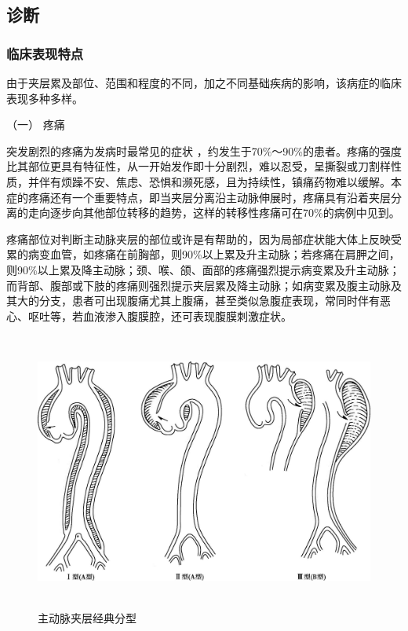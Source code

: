 \subsection{诊断}

\subsubsection{临床表现特点}

由于夹层累及部位、范围和程度的不同，加之不同基础疾病的影响，该病症的临床表现多种多样。

\hypertarget{text00314.htmlux5cux23CHP10-9-2-1-1}{}
（一） 疼痛

突发剧烈的疼痛为发病时最常见的症状
，约发生于70\%～90\%的患者。疼痛的强度比其部位更具有特征性，从一开始发作即十分剧烈，难以忍受，呈撕裂或刀割样性质，并伴有烦躁不安、焦虑、恐惧和濒死感，且为持续性，镇痛药物难以缓解。本症的疼痛还有一个重要特点，即当夹层分离沿主动脉伸展时，疼痛具有沿着夹层分离的走向逐步向其他部位转移的趋势，这样的转移性疼痛可在70\%的病例中见到。

疼痛部位对判断主动脉夹层的部位或许是有帮助的，因为局部症状能大体上反映受累的病变血管，如疼痛在前胸部，则90\%以上累及升主动脉；若疼痛在肩胛之间，则90\%以上累及降主动脉；颈、喉、颌、面部的疼痛强烈提示病变累及升主动脉；而背部、腹部或下肢的疼痛则强烈提示夹层累及降主动脉；如病变累及腹主动脉及其大的分支，患者可出现腹痛尤其上腹痛，甚至类似急腹症表现，常同时伴有恶心、呕吐等，若血液渗入腹膜腔，还可表现腹膜刺激症状。

\begin{figure}[!htbp]
 \centering
 \includegraphics[width=5.48958in,height=3.60417in]{./images/Image00483.jpg}
 \captionsetup{justification=centering}
 \caption{主动脉夹层经典分型}
 \label{fig109-1}
  \end{figure} 

